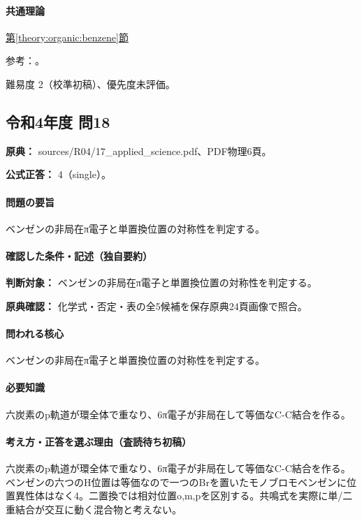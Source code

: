 \paragraph{共通理論} \hyperref[theory:organic:benzene]{第\ref*{theory:organic:benzene}節}

\par 参考：\cite{organic_benzene}。

\par 難易度 2（校準初稿）、優先度未評価。

\subsection{令和4年度 問18}
\label{q:r04-reg-applied-18}

\noindent\textbf{原典：} sources/R04/17\_applied\_science.pdf、PDF物理6頁。

\textbf{公式正答：} 4（single）。

\paragraph{問題の要旨} ベンゼンの非局在π電子と単置換位置の対称性を判定する。

\paragraph{確認した条件・記述（独自要約）}\mbox{}\par

\noindent\textbf{判断対象：} ベンゼンの非局在π電子と単置換位置の対称性を判定する。\par

\noindent\textbf{原典確認：} 化学式・否定・表の全5候補を保存原典24頁画像で照合。\par

\paragraph{問われる核心} ベンゼンの非局在π電子と単置換位置の対称性を判定する。

\paragraph{必要知識} 六炭素のp軌道が環全体で重なり、6π電子が非局在して等価なC-C結合を作る。

\paragraph{考え方・正答を選ぶ理由（査読待ち初稿）} 六炭素のp軌道が環全体で重なり、6π電子が非局在して等価なC-C結合を作る。ベンゼンの六つのH位置は等価なので一つのBrを置いたモノブロモベンゼンに位置異性体はなく4。二置換では相対位置o,m,pを区別する。共鳴式を実際に単/二重結合が交互に動く混合物と考えない。

